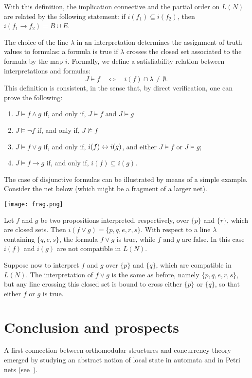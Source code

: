 \documentclass{eptcs}
\newcommand{\comp}{\mathrel{\smash{\leftrightarrow}}} \newcommand{\cuts}[1]{\mathcal{C}(#1)}         \newcommand{\lines}[1]{\mathcal{L}(#1)}        \newcommand{\CC}[1]{\Gamma(#1)}            \newcommand{\LL}[1]{\mathbf{L}(#1)}            \newcommand{\qed}{\quad$\Box$}
\begin{document}
With this definition, the implication connective and the
partial order on $L(N)$ are related by the following
statement: if $i(f_1) \subseteq i(f_2)$, then
$i(f_1 \rightarrow f_2) = B \cup E$.

The choice of the line $\lambda$ in an interpretation
determines the assignment of
truth values to formulas: a formula is true if $\lambda$
crosses the closed set associated to the formula by the
map $i$.
Formally, we define a satisfiability relation between interpretations
and formulas:
\[
  J \models f \quad \Leftrightarrow \quad i(f) \cap \lambda \not= \emptyset.
\]
This definition is consistent, in the sense that, by direct
verification, one can prove the following:
\begin{enumerate}
  \item $J \models f \wedge g$ if, and only if, $J \models f$
        and $J \models g$
  \item $J \models \neg f$ if, and only if,
        $J \not\models f$
  \item $J \models f \vee g$ if, and only if,
        $i(f) \comp i(g)$, and either $J \models f$ or $J \models g$;
  \item $J \models f \rightarrow g$ if, and only if,
        $i(f) \subseteq i(g)$.
\end{enumerate}
The case of disjunctive formulas can be illustrated by means
of a simple example. Consider the net below
(which might be a fragment of a larger net).
\begin{center}
  \texttt{[image: frag.png]}
\end{center}
Let $f$ and $g$ be two propositions interpreted,
respectively, over $\{p\}$ and $\{r\}$, which are
closed sets. Then
$i(f \vee g) = \{p, q, e, r, s\}$. With respect to a line
$\lambda$ containing $\{q, e, s\}$, the formula $f \vee g$ is true,
while $f$ and $g$ are false. In this
case $i(f)$ and $i(g)$ are not compatible in $L(N)$.

Suppose now to interpret $f$ and $g$ over $\{p\}$ and $\{q\}$,
which are compatible in $L(N)$. The interpretation of $f \vee g$
is the same as before, namely $\{p, q, e, r, s\}$, but any
line crossing this closed set is bound to cross either
$\{p\}$ or $\{q\}$, so that either $f$ or $g$ is true.
\section{Conclusion and prospects}
A first connection between orthomodular structures
and concurrency theory emerged by studying an
abstract notion of local state in automata and in
Petri nets (see~\cite{BFP03}).
\end{document}
